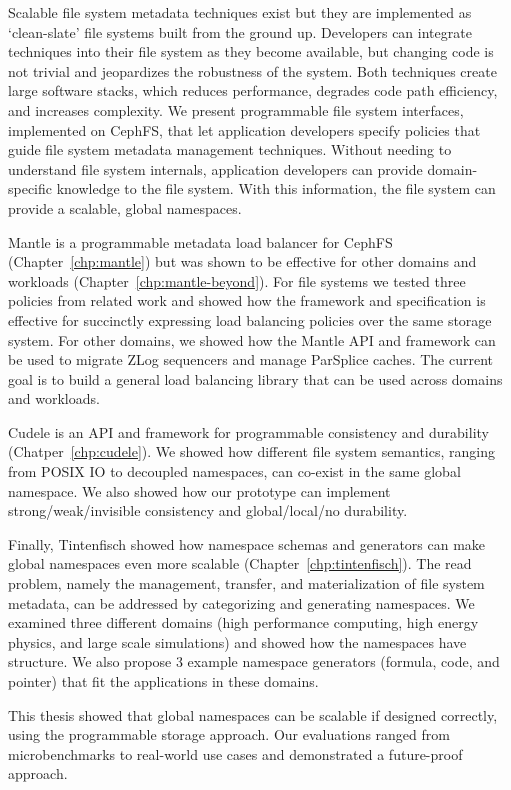 Scalable file system metadata techniques exist but they are implemented as
`clean-slate' file systems built from the ground up. Developers can integrate
techniques into their file system as they become available, but changing code
is not trivial and jeopardizes the robustness of the system. Both techniques
create large software stacks, which reduces performance, degrades code path
efficiency, and increases complexity. We present programmable file system
interfaces, implemented on CephFS, that let application developers specify
policies that guide file system metadata management techniques. Without needing
to understand file system internals, application developers can provide
domain-specific knowledge to the file system. With this information, the file
system can provide a scalable, global namespaces.

Mantle is a programmable metadata load balancer for CephFS
(Chapter~\ref{chp:mantle}) but was shown to be effective for other domains and
workloads (Chapter~\ref{chp:mantle-beyond}). For file systems we tested three
policies from related work and showed how the framework and specification is
effective for succinctly expressing load balancing policies over the same
storage system. For other domains, we showed how the Mantle API and framework
can be used to migrate ZLog sequencers and manage ParSplice caches. The current
goal is to build a general load balancing library that can be used across
domains and workloads.

Cudele is an API and framework for programmable consistency and durability
(Chatper~\ref{chp:cudele}). We showed how different file system semantics,
ranging from POSIX IO to decoupled namespaces, can co-exist in the same global
namespace. We also showed how our prototype can implement strong/weak/invisible
consistency and global/local/no durability.

Finally, Tintenfisch showed how namespace schemas and generators can make global
namespaces even more scalable (Chapter~\ref{chp:tintenfisch}). The read
problem, namely the management, transfer, and materialization of file system
metadata, can be addressed by categorizing and generating namespaces. We
examined three different domains (high performance computing, high energy
physics, and large scale simulations) and showed how the namespaces have
structure. We also propose 3 example namespace generators (formula, code, and
pointer) that fit the applications in these domains.

This thesis showed that global namespaces can be scalable if designed correctly,
using the programmable storage approach. Our evaluations ranged from
microbenchmarks to real-world use cases and demonstrated a future-proof
approach.
